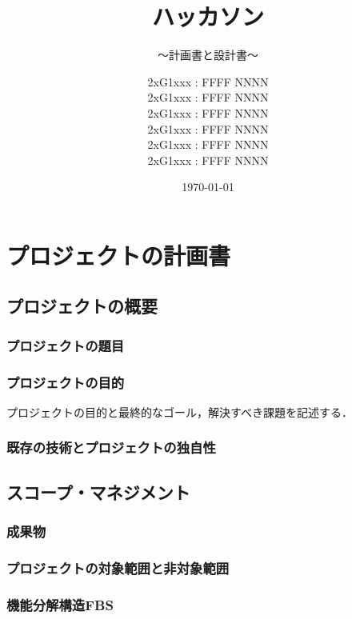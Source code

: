 \documentclass[lualatex,book,paper=a4paper,jafontsize=11.5pt,jafontscale=1.05]{jlreq}
\title{ハッカソン}
\subtitle{～計画書と設計書～}
\author{
	2xG1xxx : FFFF NNNN\\
        2xG1xxx : FFFF NNNN\\
	2xG1xxx : FFFF NNNN\\
        2xG1xxx : FFFF NNNN\\
        2xG1xxx : FFFF NNNN\\
        2xG1xxx : FFFF NNNN 
        }
\date{\today}
\begin{document}
\maketitle

\setcounter{tocdepth}{2}
\tableofcontents \thispagestyle{empty}

\chapter{プロジェクトの計画書} \label{chap:project-plan}\setcounter{page}{1}


\section{プロジェクトの概要}
\subsection{プロジェクトの題目}

\subsection{プロジェクトの目的}
プロジェクトの目的と最終的なゴール，解決すべき課題を記述する．

\subsection{既存の技術とプロジェクトの独自性}

\section{スコープ・マネジメント}
\subsection{成果物}

\subsection{プロジェクトの対象範囲と非対象範囲}

\subsection{機能分解構造FBS}
\end{document}
